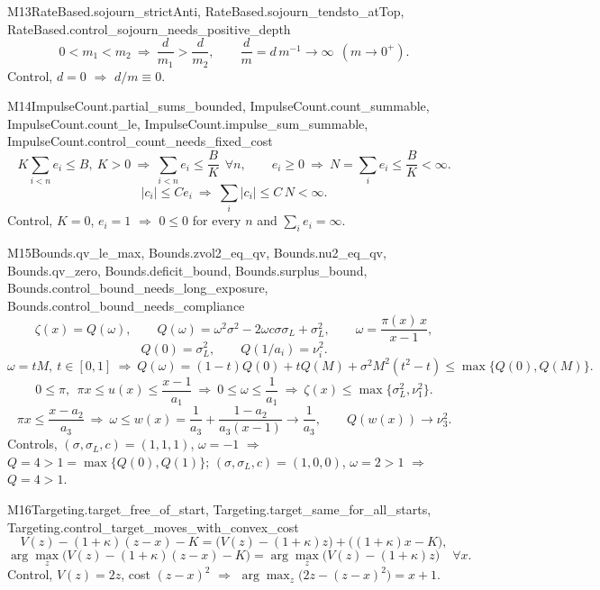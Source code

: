 \begin{mproof}{M13}{RateBased.sojourn_strictAnti, RateBased.sojourn_tendsto_atTop, RateBased.control_sojourn_needs_positive_depth}
\[ 0<m_1<m_2\ \Rightarrow\ \frac d{m_1}>\frac d{m_2},\qquad \frac dm=d\,m^{-1}\to\infty\ \ (m\to0^+) . \]
Control, $d=0$ $\Rightarrow$ $d/m\equiv0$.
\end{mproof}

\begin{mproof}{M14}{ImpulseCount.partial_sums_bounded, ImpulseCount.count_summable, ImpulseCount.count_le, ImpulseCount.impulse_sum_summable, ImpulseCount.control_count_needs_fixed_cost}
\[ K\sum_{i<n}e_i\le B,\ K>0\ \Rightarrow\ \sum_{i<n}e_i\le\frac BK\ \ \forall n,\qquad e_i\ge0\ \Rightarrow\ N=\sum_ie_i\le\frac BK<\infty . \]
\[ |c_i|\le Ce_i\ \Rightarrow\ \sum_i|c_i|\le C\,N<\infty . \]
Control, $K=0$, $e_i=1$ $\Rightarrow$ $0\le0$ for every $n$ and $\sum_ie_i=\infty$.
\end{mproof}

\begin{mproof}{M15}{Bounds.qv_le_max, Bounds.zvol2_eq_qv, Bounds.nu2_eq_qv, Bounds.qv_zero, Bounds.deficit_bound, Bounds.surplus_bound, Bounds.control_bound_needs_long_exposure, Bounds.control_bound_needs_compliance}
\[ \zeta(x)=Q(\omega),\qquad Q(\omega)=\omega^2\sigma^2-2\omega c\sigma\sigma_L+\sigma_L^2,\qquad \omega=\frac{\pi(x)\,x}{x-1}, \]
\[ Q(0)=\sigma_L^2,\qquad Q(1/a_i)=\nu_i^2 . \]
\[ \omega=tM,\ t\in[0,1]\ \Rightarrow\ Q(\omega)=(1-t)Q(0)+tQ(M)+\sigma^2M^2(t^2-t)\le\max\{Q(0),Q(M)\} . \]
\[ 0\le\pi,\ \ \pi x\le u(x)\le\frac{x-1}{a_1}\ \Rightarrow\ 0\le\omega\le\frac1{a_1}\ \Rightarrow\ \zeta(x)\le\max\{\sigma_L^2,\nu_1^2\} . \]
\[ \pi x\le\frac{x-a_2}{a_3}\ \Rightarrow\ \omega\le w(x)=\frac1{a_3}+\frac{1-a_2}{a_3(x-1)}\to\frac1{a_3},\qquad Q(w(x))\to\nu_3^2 . \]
Controls, $(\sigma,\sigma_L,c)=(1,1,1)$, $\omega=-1$ $\Rightarrow$ $Q=4>1=\max\{Q(0),Q(1)\}$; $(\sigma,\sigma_L,c)=(1,0,0)$, $\omega=2>1$ $\Rightarrow$ $Q=4>1$.
\end{mproof}

\begin{mproof}{M16}{Targeting.target_free_of_start, Targeting.target_same_for_all_starts, Targeting.control_target_moves_with_convex_cost}
\[ V(z)-(1+\kappa)(z-x)-K=\big(V(z)-(1+\kappa)z\big)+\big((1+\kappa)x-K\big), \]
\[ \arg\max_z\big(V(z)-(1+\kappa)(z-x)-K\big)=\arg\max_z\big(V(z)-(1+\kappa)z\big)\quad\forall x . \]
Control, $V(z)=2z$, cost $(z-x)^2$ $\Rightarrow$ $\arg\max_z\big(2z-(z-x)^2\big)=x+1$.
\end{mproof}

